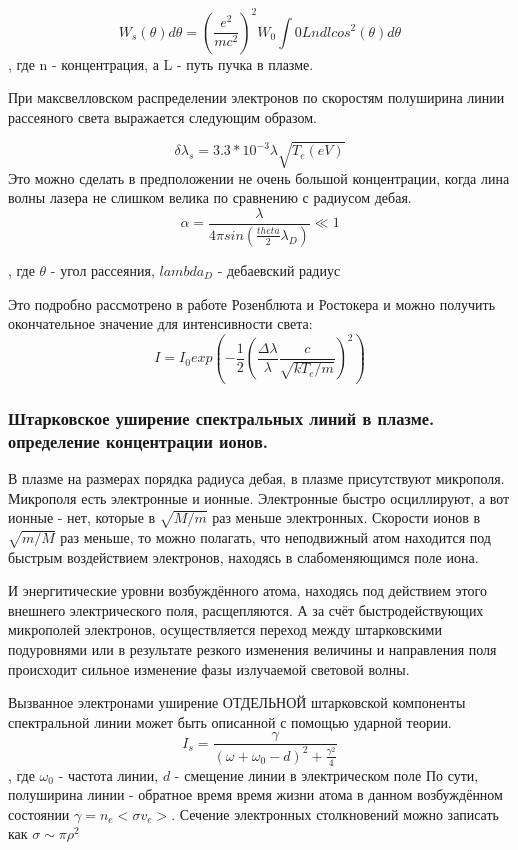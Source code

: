 \documentclass[10pt, a4paper]{article}
\begin{document}
\begin{equation}
	W_{s} (\theta) d\theta=(\frac{e^{2}}{mc^{2}})^{2} W_0 \int {0}{L} n dl cos^{2}(\theta) d \theta
\end{equation}
, где n -  концентрация, а L - путь пучка в плазме.

При максвелловском распределении электронов по скоростям полуширина линии рассеяного света выражается следующим образом.

\begin{equation}
	\delta \lambda_s = 3.3*10^{-3} \lambda \sqrt{T_e (eV)}
\end{equation}
Это можно сделать в предположении не очень большой концентрации, когда лина волны лазера не слишком велика по сравнению с радиусом дебая.
\begin{equation}
	\alpha = \frac{\lambda}{4\pi sin(\frac{theta}{2} \lambda_D)} \ll 1
\end{equation}

, где $\theta$ - угол рассеяния, $lambda_D$ - дебаевский радиус

Это подробно рассмотрено в работе Розенблюта и Ростокера и можно получить окончательное значение для интенсивности света:
\begin{equation}
	I=I_0 exp(- \frac{1}{2} (\frac{\Delta \lambda}{\lambda} \frac{c}{\sqrt{kT_e /m}})^{2})
\end{equation}


\subsubsection{ Штарковское уширение спектральных линий в плазме. определение концентрации ионов.}
\label{11.2.3.3}

В плазме на размерах порядка радиуса дебая, в плазме присутствуют микрополя. Микрополя есть электронные и ионные. Электронные быстро осциллируют, а вот ионные - нет, которые в $\sqrt{M/m}$ раз меньше электронных. Скорости ионов в $\sqrt{m/M}$ раз меньше, то можно полагать, что неподвижный атом находится под быстрым воздействием электронов, находясь в слабоменяющимся поле иона. 

И энергитические уровни возбуждённого атома, находясь под действием этого внешнего электрического поля, расщепляются. А за счёт быстродействующих микрополей электронов, осуществляется переход между штарковскими подуровнями или в результате резкого изменения величины и направления поля происходит сильное изменение фазы излучаемой световой волны. 

Вызванное электронами уширение ОТДЕЛЬНОЙ штарковской компоненты спектральной линии может быть описанной с помощью ударной теории.
\begin{equation}
	I_s=\frac{\gamma}{(\omega + \omega_0 - d)^{2}+ \frac{\gamma^{2}}{4}}
\end{equation}
, где $\omega_0$ - частота линии, $d$ -  смещение линии в электрическом поле
По сути, полуширина линии - обратное время время жизни атома в данном возбуждённом состоянии $\gamma =n_e <\sigma v_e>$.
Сечение электронных столкновений можно записать как $\sigma \sim \pi \rho^{2}$
\end{document}
